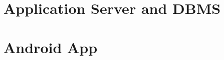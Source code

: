 \section{Application Server and DBMS}
\label{sect:Application Server and DBMS}

\section{Android App}
\label{sect:Android App}
